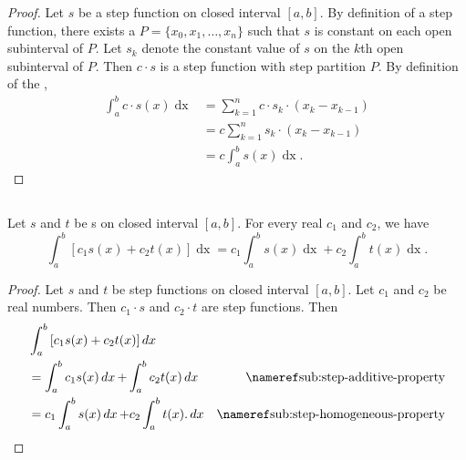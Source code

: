 \documentclass{report}
\begin{document}
  \begin{proof}
    Let $s$ be a step function on closed interval $[a, b]$.
    By definition of a step function, there exists a 
      $P = \{x_0, x_1, \ldots, x_n\}$ such that $s$ is constant on each open
      subinterval of $P$.
    Let $s_k$ denote the constant value of $s$ on the $k$th open subinterval of
      $P$.
    Then $c \cdot s$ is a step function with step partition $P$.
    By definition of the ,
      \begin{align*}
        \int_a^b c \cdot s(x) \mathop{dx}
          & = \sum_{k=1}^n c \cdot s_k \cdot (x_k - x_{k-1}) \\
          & = c \sum_{k=1}^n s_k \cdot (x_k - x_{k-1}) \\
          & = c \int_a^b s(x) \mathop{dx}.
      \end{align*}
  \end{proof}

\subsection{}%

  \begin{theorem}[1.4]
    Let $s$ and $t$ be s on closed interval
      $[a, b]$.
    For every real $c_1$ and $c_2$, we have
      $$\int_a^b \left[ c_1s(x) + c_2t(x) \right] \mathop{dx} =
        c_1\int_a^b s(x) \mathop{dx} + c_2\int_a^b t(x) \mathop{dx}.$$
  \end{theorem}

  \begin{proof}
    Let $s$ and $t$ be step functions on closed interval $[a, b]$.
    Let $c_1$ and $c_2$ be real numbers.
    Then $c_1 \cdot s$ and $c_2 \cdot t$ are step functions.
    Then
      \begin{align*}
        & \int_a^b \left[ c_1s(x) + c_2t(x) \right] \mathop{dx} \\
        & = \int_a^b c_1s(x) \mathop{dx} + \int_a^b c_2t(x) \mathop{dx}
          & \textref{sub:step-additive-property} \\
        & = c_1\int_a^b s(x) \mathop{dx} + c_2\int_a^b t(x). \mathop{dx}
          & \textref{sub:step-homogeneous-property}
      \end{align*}
  \end{proof}
\end{document}
